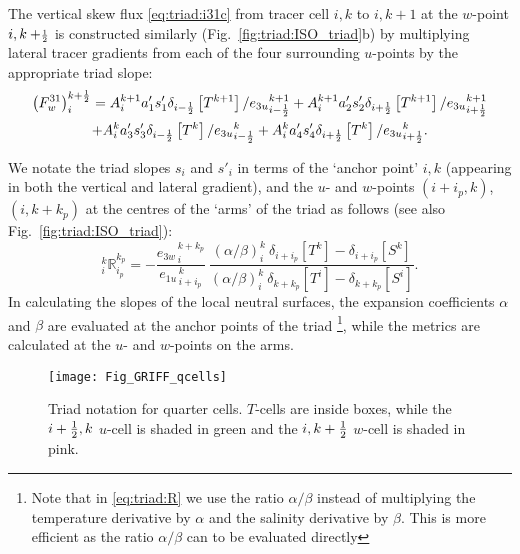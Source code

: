 \documentclass[NEMO_book]{subfiles}
\begin{document}
 The vertical skew flux \eqref{eq:triad:i31c} from tracer cell $i,k$ to $i,k+1$ at the
$w$-point $i,k+\scriptstyle\frac{1}{2}$ is constructed similarly (Fig.~\ref{fig:triad:ISO_triad}b)
by multiplying lateral tracer gradients from each of the four
surrounding $u$-points by the appropriate triad slope:
\begin{multline}
  \label{eq:triad:i31}
  \left( F_w^{31} \right) _i ^{k+\frac{1}{2}} =  {A}_i^{k+1} a_{1}'
  s_{1}' \delta _{i-\frac{1}{2}} \left[ T^{k+1} \right]/{e_{3u}}_{i-\frac{1}{2}}^{k+1}
   +{A}_i^{k+1} a_{2}' s_{2}' \delta _{i+\frac{1}{2}} \left[ T^{k+1} \right]/{e_{3u}}_{i+\frac{1}{2}}^{k+1}\\
  + {A}_i^k a_{3}' s_{3}' \delta _{i-\frac{1}{2}} \left[ T^k\right]/{e_{3u}}_{i-\frac{1}{2}}^k
  +{A}_i^k a_{4}' s_{4}' \delta _{i+\frac{1}{2}} \left[ T^k \right]/{e_{3u}}_{i+\frac{1}{2}}^k.
\end{multline}

We notate the triad slopes $s_i$ and $s'_i$ in terms of the `anchor point' $i,k$
(appearing in both the vertical and lateral gradient), and the $u$- and
$w$-points $(i+i_p,k)$, $(i,k+k_p)$ at the centres of the `arms' of the
triad as follows (see also Fig.~\ref{fig:triad:ISO_triad}):
\begin{equation}
  \label{eq:triad:R}
  _i^k \mathbb{R}_{i_p}^{k_p}
  =-\frac{ {e_{3w}}_{\,i}^{\,k+k_p}} { {e_{1u}}_{\,i+i_p}^{\,k}}
  \
  \frac
  {\left(\alpha / \beta \right)_i^k  \ \delta_{i + i_p}[T^k] - \delta_{i + i_p}[S^k] }
  {\left(\alpha / \beta \right)_i^k  \ \delta_{k+k_p}[T^i ] - \delta_{k+k_p}[S^i ] }.
\end{equation}
In calculating the slopes of the local neutral
surfaces, the expansion coefficients $\alpha$ and $\beta$ are
evaluated at the anchor points of the triad \footnote{Note that in \eqref{eq:triad:R} we use the ratio $\alpha / \beta$
instead of multiplying the temperature derivative by $\alpha$ and the
salinity derivative by $\beta$. This is more efficient as the ratio
$\alpha / \beta$ can to be evaluated directly}, while the metrics are
calculated at the $u$- and $w$-points on the arms.

\begin{figure}[h] \begin{center}
    \texttt{[image: Fig\_GRIFF\_qcells]}
    \caption{   \label{fig:triad:qcells}
    Triad notation for quarter cells. $T$-cells are inside
      boxes, while the  $i+\textstyle\frac{1}{2},k$ $u$-cell is shaded in green and the
      $i,k+\textstyle\frac{1}{2}$ $w$-cell is shaded in pink.}
  \end{center} \end{figure}
\end{document}

